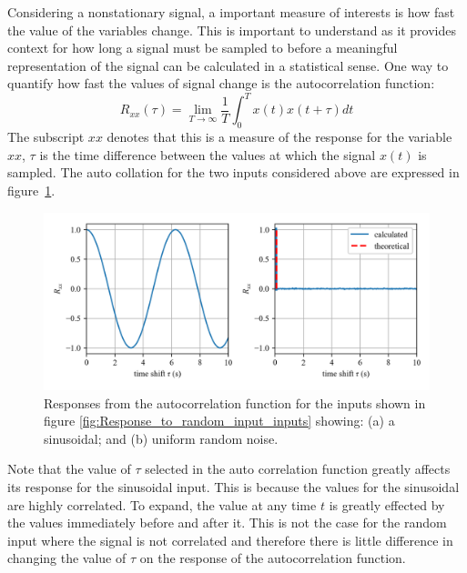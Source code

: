 \documentclass[12pt,letter]{article}
\numberwithin{ex}{section} %
\numberwithin{re}{section} %
\numberwithin{equation}{section}	%
\begin{document}
Considering a nonstationary signal, a important measure of interests is how fast the value of the variables change. This is important to understand as it provides context for how long a signal must be sampled to before a meaningful representation of the signal can be calculated in a statistical sense. One way to quantify how fast the values of signal change is the autocorrelation function: 
\begin{equation}
R_{xx}(\tau) = \lim\limits_{T \rightarrow \infty} \frac{1}{T} \int_{0}^{T}x(t)x(t+\tau)dt
\end{equation}
The subscript $xx$ denotes that this is a measure of the response for the variable $xx$, $\tau$ is the time difference between the values at which the signal $x(t)$ is sampled. The auto collation for the two inputs considered above are expressed in figure~\ref{fig:Response_to_random_input_autocorrelation}.
\begin{figure}[H]
	\centering
	\includegraphics[width=1\textwidth]{../figures/Response_to_random_input_autocorrelation.png}
	\caption{Responses from the autocorrelation function for the inputs shown in figure \ref{fig:Response_to_random_input_inputs} showing: (a) a sinusoidal; and (b) uniform random noise.}
	\label{fig:Response_to_random_input_autocorrelation}
\end{figure}
\noindent Note that the value of $\tau$ selected in the auto correlation function greatly affects its response for the sinusoidal input. This is because the values for the sinusoidal are highly correlated. To expand, the value at any time $t$ is greatly effected by the values immediately before and after it. This is not the case for the random input where the signal is not correlated and therefore there is little difference in changing the value of $\tau$ on the response of the autocorrelation function.  
\end{document}
